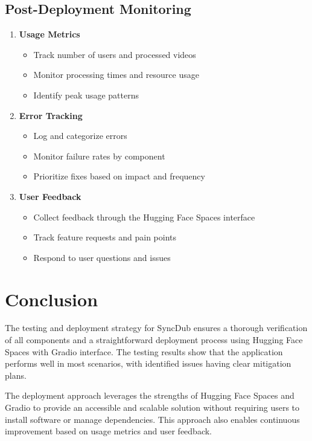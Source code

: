 \documentclass[11pt,a4paper]{article}
\begin{document}
\subsection{Post-Deployment Monitoring}

\begin{enumerate}
    \item \textbf{Usage Metrics}
    \begin{itemize}
        \item Track number of users and processed videos
        \item Monitor processing times and resource usage
        \item Identify peak usage patterns
    \end{itemize}
    
    \item \textbf{Error Tracking}
    \begin{itemize}
        \item Log and categorize errors
        \item Monitor failure rates by component
        \item Prioritize fixes based on impact and frequency
    \end{itemize}
    
    \item \textbf{User Feedback}
    \begin{itemize}
        \item Collect feedback through the Hugging Face Spaces interface
        \item Track feature requests and pain points
        \item Respond to user questions and issues
    \end{itemize}
\end{enumerate}

\section{Conclusion}

The testing and deployment strategy for SyncDub ensures a thorough verification of all components and a straightforward deployment process using Hugging Face Spaces with Gradio interface. The testing results show that the application performs well in most scenarios, with identified issues having clear mitigation plans. 

The deployment approach leverages the strengths of Hugging Face Spaces and Gradio to provide an accessible and scalable solution without requiring users to install software or manage dependencies. This approach also enables continuous improvement based on usage metrics and user feedback.
\end{document}
